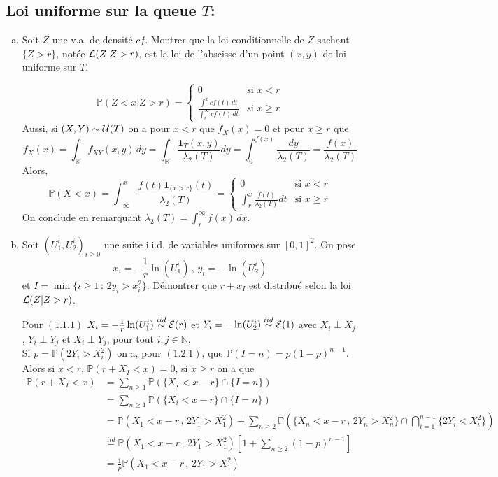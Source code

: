 \documentclass[a4paper]{article}
\begin{document}
\subsection{Loi uniforme sur la queue $T$:}
\begin{enumerate}[(a)]
\item Soit $Z$ une v.a. de densit\'e $cf$. Montrer que la loi conditionnelle de $Z$ sachant $\{Z>r\}$, not\'ee ${\cal L}(Z|Z>r)$, est la loi de l'abscisse d'un point $(x,y)$ de loi uniforme sur $T$.

$$\mathbb{P}(Z<x|Z>r) = \begin{cases}0 &\text{si $x<r$}\\\displaystyle\frac{\int_r^xcf(t)\,dt}{\int_r^{\infty}cf(t)\,dt}&\text{si $x\geq r$}\end{cases}$$
Aussi, si $(X,Y)\sim{\cal U}(T)$ on a pour $x<r$ que $f_X(x)=0$  et pour $x\geq r$ que
$$f_X(x) = \int_{\mathbb{R}}f_{XY}(x,y)\,dy = \int_{\mathbb{R}}\frac{\mathbf{1}_{T}(x,y)}{\lambda_2(T)}dy = \int_0^{f(x)}\frac{dy}{\lambda_2(T)} = \frac{f(x)}{\lambda_2(T)}$$
Alors, $$\mathbb{P}(X<x) = \int_{-\infty}^x\frac{f(t)\mathbf{1}_{\{x>r\}}(t)}{\lambda_2(T)} = \begin{cases}0 &\text{si $x<r$}\\\displaystyle\int_r^x\frac{f(t)}{\lambda_2(T)}dt&\text{si $x\geq r$}\end{cases}$$
On conclude en remarquant $\lambda_2(T) = \displaystyle\int_r^{\infty}f(x)\,dx$.


\item Soit $(U_1^i,U_2^i)_{i\geq0}$ une suite i.i.d. de variables uniformes sur $[0,1]^2$. On pose
$$x_i = -\frac{1}{r}\ln(U_1^i)\,,\,y_i = -\ln(U_2^i)$$
et $I = \min\{i\geq1\,:\,2y_i>x_i^2\}$. D\'emontrer que $r+x_I$ est distribu\'e selon la loi ${\cal L}(Z|Z>r)$.

Pour $(1.1.1)$ $X_i = -\frac{1}{r}\ln(U_1^i)\stackrel{iid}{\sim}{\cal E}(r)$ et $Y_i = -\ln(U_2^i)\stackrel{iid}{\sim}{\cal E}(1)$ avec $X_i\perp X_j$, $Y_i\perp Y_j$ et $X_i\perp Y_j$, pour tout $i,j\in\mathbb{N}$.
\\Si $p = \mathbb{P}(2Y_i>X_i^2)$ on a, pour $(1.2.1)$, que $\mathbb{P}(I=n) = p(1-p)^{n-1}$. Alors si $x<r$, $\mathbb{P}(r+X_I<x) = 0$, si $x\geq r$ on a que
\begin{align*}
\mathbb{P}(r+X_I<x) &= \sum\limits_{n\geq1}\mathbb{P}(\{X_I<x-r\}\cap\{I=n\})\\
&= \sum\limits_{n\geq1}\mathbb{P}(\{X_i<x-r\}\cap\{I=n\})\\
&= \mathbb{P}(X_1<x-r\,,\,2Y_1>X_1^2) + \sum\limits_{n\geq2}\mathbb{P}\left(\{X_n<x-r\,,\,2Y_n>X_n^2\}\cap\bigcap\limits_{i=1}^{n-1}\{2Y_i<X_i^2\}\right)\\
&\stackrel{iid}{=}\mathbb{P}(X_1<x-r\,,\,2Y_1>X_1^2)\left[ 1 + \sum\limits_{n\geq2}(1-p)^{n-1} \right]\\
&= \frac{1}{p}\mathbb{P}(X_1<x-r\,,\,2Y_1>X_1^2)
\end{align*}


\end{enumerate}
\end{document}
